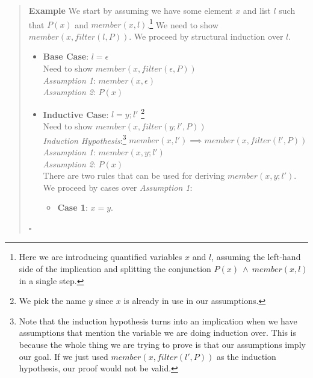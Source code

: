 \documentclass{tufte-handout}
\newcounter{example}
\newenvironment{example}
{\refstepcounter{example}\begin{quote}
\textbf{Example \arabic{example}}}
{

$\square$\end{quote}}
\begin{document}
\begin{example}
  We start by assuming we have some element $x$ and list $l$ such
  that $P(x)$ and $\mathit{member}(x, l)$.\footnote{Here we are
    introducing quantified variables $x$ and $l$, assuming the
    left-hand side of the implication and splitting the
    conjunction $P(x) ~\land~ \mathit{member}(x, l)$ in a single
    step.} We need to show
  $\mathit{member}(x, \mathit{filter}(l, P))$. We proceed by
  structural induction over $l$.
  \begin{itemize}
  \item \textbf{Base Case}: $l = \epsilon$ \\
    Need to show $\mathit{member}(x, \mathit{filter}(\epsilon, P))$\\
    \textit{Assumption 1}: $\mathit{member}(x, \epsilon)$\\
    \textit{Assumption 2}: $P(x)$\\
  \item \textbf{Inductive Case}: $l = y; l'$ \footnote{We pick the name $y$ since $x$ is already in use in our assumptions.}\\
    Need to show
    $\mathit{member}(x, \mathit{filter}(y; l', P))$\\
    \textit{Induction Hypothesis}:\footnote{Note that the
      induction hypothesis turns into an implication when we have
      assumptions that mention the variable we are doing induction
      over. This is because the whole thing we are trying to prove
      is that our assumptions imply our goal. If we just used
      $\mathit{member}(x, \mathit{filter}(l', P))$ as the
      induction hypothesis, our proof would not be valid. }
    $\mathit{member}(x, l') \implies \mathit{member}(x,
    \mathit{filter}(l', P))$\\
    \textit{Assumption 1}: $\mathit{member}(x, y; l')$\\
    \textit{Assumption 2}: $P(x)$\\
    There are two rules that can be used for deriving
    $\mathit{member}(x, y; l')$. We proceed by cases over
    \textit{Assumption 1}:
    \begin{itemize}
      \item \textbf{Case 1}: $x = y$. \\

\end{itemize}
\end{itemize}
\end{example}
\end{document}
